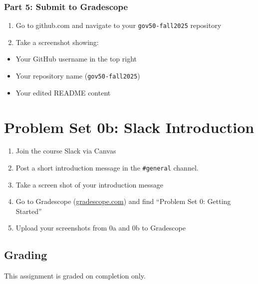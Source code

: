 \documentclass[
  11pt,
  letterpaper]{article}
\providecommand{\tightlist}{%
  \setlength{\itemsep}{0pt}\setlength{\parskip}{0pt}}
\begin{document}
\subsubsection{Part 5: Submit to
Gradescope}\label{part-5-submit-to-gradescope}

\begin{enumerate}
\def\labelenumi{\arabic{enumi}.}
\tightlist
\item
  Go to github.com and navigate to your \texttt{gov50-fall2025}
  repository
\item
  Take a screenshot showing:
\end{enumerate}

\begin{itemize}
\tightlist
\item
  Your GitHub username in the top right
\item
  Your repository name (\texttt{gov50-fall2025})
\item
  Your edited README content
\end{itemize}

\section{Problem Set 0b: Slack
Introduction}\label{problem-set-0b-slack-introduction}

\begin{enumerate}
\def\labelenumi{\arabic{enumi}.}
\tightlist
\item
  Join the course Slack via Canvas
\item
  Post a short introduction message in the \texttt{\#general} channel.
\item
  Take a screen shot of your introduction message
\item
  Go to Gradescope (\url{gradescope.com}) and find ``Problem Set 0:
  Getting Started''
\item
  Upload your screenshots from 0a and 0b to Gradescope
\end{enumerate}

\subsection{Grading}\label{grading}

This assignment is graded on completion only.
\end{document}
